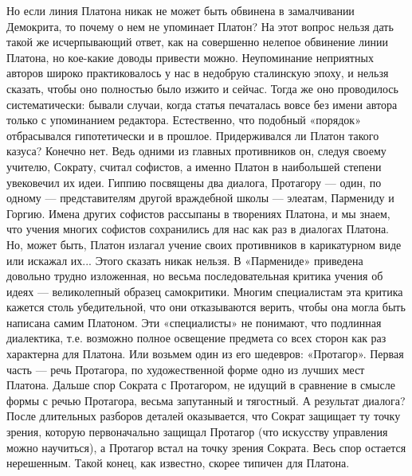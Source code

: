 Но  если линия  Платона никак  не может  быть обвинена  в замалчивании
Демокрита, то почему о нем не  упоминает Платон? На этот вопрос нельзя
дать такой же исчерпывающий ответ, как на совершенно нелепое обвинение
линии  Платона,  но  кое-какие  доводы  привести  можно.  Неупоминание
неприятных авторов  широко практиковалось у нас  в недобрую сталинскую
эпоху, и  нельзя сказать,  чтобы оно полностью  было изжито  и сейчас.
Тогда же  оно проводилось систематически: бывали  случаи, когда статья
печаталась  вовсе без  имени  автора только  с упоминанием  редактора.
Естественно,  что подобный  «порядок» отбрасывался  гипотетически и  в
прошлое.  Придерживался ли  Платон  такого казуса?  Конечно нет.  Ведь
одними  из главных  противников  он, следуя  своему учителю,  Сократу,
считал  софистов,  а именно  Платон  в  наибольшей степени  увековечил
их  идеи.  Гиппию  посвящены  два  диалога,  Протагору  ---  один,  по
одному  ---  представителям  другой   враждебной  школы  ---  элеатам,
Пармениду  и  Горгию.  Имена  других софистов  рассыпаны  в  творениях
Платона,  и  мы знаем,  что  учения  многих софистов  сохранились  для
нас  как  раз в  диалогах  Платона.  Но,  может быть,  Платон  излагал
учение  своих  противников  в  карикатурном  виде  или  искажал  их...
Этого сказать  никак нельзя.  В «Пармениде» приведена  довольно трудно
изложенная,  но весьма  последовательная критика  учения об  идеях ---
великолепный  образец  самокритики.  Многим специалистам  эта  критика
кажется  столь убедительной,  что они  отказываются верить,  чтобы она
могла  быть написана  самим Платоном.  Эти «специалисты»  не понимают,
что  подлинная диалектика,  т.е.  возможно  полное освещение  предмета
со  всех сторон  как  раз  характерна для  Платона.  Или возьмем  один
из  его шедевров:  «Протагор».  Первая часть  ---  речь Протагора,  по
художественной форме одно из лучших  мест Платона. Дальше спор Сократа
с Протагором, не идущий в сравнение  в смысле формы с речью Протагора,
весьма запутанный  и тягостный. А результат  диалога? После длительных
разборов  деталей оказывается,  что Сократ  защищает ту  точку зрения,
которую первоначально защищал Протагор (что искусству управления можно
научиться),  а  Протагор встал  на  точку  зрения Сократа.  Весь  спор
остается  нерешенным. Такой  конец, как  известно, скорее  типичен для
Платона.

